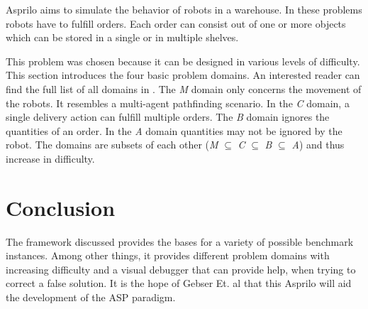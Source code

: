 \documentclass[runningheads]{llncs}
\newcommand{\authorquote}{Gebser Et. al}
\begin{document}
Asprilo aims to simulate the behavior of robots in a warehouse. In these problems robots have to fulfill orders. Each order can consist out of one or more objects which can be stored in a single or in multiple shelves. 

This problem was chosen because it can be designed in various levels of difficulty. This section introduces the four basic problem domains. An interested reader can find the full list of all domains in \cite{gebser2018experimenting}. The \textit{M} domain only concerns the movement of the robots. It resembles a multi-agent pathfinding scenario. In the \textit{C} domain, a single delivery action can fulfill multiple orders. The \textit{B} domain ignores the quantities of an order. In the \textit{A} domain quantities may not be ignored by the robot. The domains are subsets of each other (\textit{M} $\subseteq$ \textit{C} $\subseteq$ \textit{B} $\subseteq$ \textit{A})  and thus increase in difficulty. 



\section{Conclusion} \label{sec:conclusion}

The framework discussed provides the bases for a variety of possible benchmark instances. Among other things, it provides different problem domains with increasing difficulty and a visual debugger that can provide help, when trying to correct a false solution. It is the hope of \authorquote{}       that this Asprilo will aid the development of the ASP paradigm. 
\end{document}
